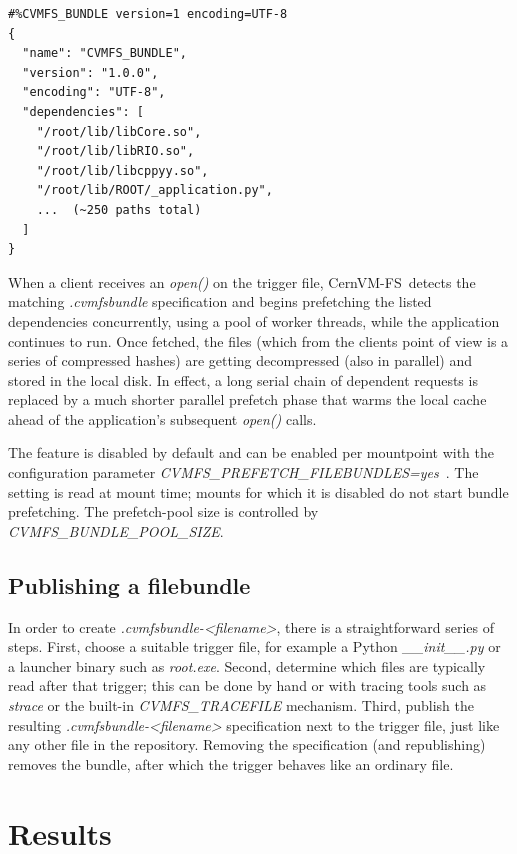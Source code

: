 \documentclass{webofc}
\newcommand{\cvmfs}{CernVM-FS}
\begin{document}
\begin{lstlisting}[style=bundle]
#%CVMFS_BUNDLE version=1 encoding=UTF-8
{
  "name": "CVMFS_BUNDLE",
  "version": "1.0.0",
  "encoding": "UTF-8",
  "dependencies": [
    "/root/lib/libCore.so",
    "/root/lib/libRIO.so",
    "/root/lib/libcppyy.so",
    "/root/lib/ROOT/_application.py",
    ...  (~250 paths total)
  ]
}
\end{lstlisting}

When a client receives an \emph{open()} on the trigger file, \cvmfs\ detects the matching
\emph{.cvmfsbundle} specification and begins prefetching the listed
dependencies concurrently, using a pool of worker threads, while the
application continues to run. 
Once fetched, the files (which from the clients point of view is a series of compressed hashes) are getting decompressed (also in parallel) and stored in the local disk.
In effect, a long serial chain of
dependent requests is replaced by a much shorter parallel prefetch
phase that warms the local cache ahead of the application's subsequent
\emph{open()} calls.

The feature is disabled by default and can be enabled per mountpoint with the configuration parameter
\emph{CVMFS\_PREFETCH\_FILEBUNDLES=yes}~\cite{ref-docs}. The setting
is read at mount time; mounts for which it is disabled do not start
bundle prefetching. The prefetch-pool size is controlled by
\emph{CVMFS\_BUNDLE\_POOL\_SIZE}.

\subsection{Publishing a filebundle}
\label{sec-publish}

In order to create \emph{.cvmfsbundle-<filename>}, there is a straightforward series of steps.
First, choose a suitable trigger file, for example a Python
\emph{\_\_init\_\_.py} or a launcher binary such as
\emph{root.exe}. Second, determine which files are typically read
after that trigger; this can be done by hand or with tracing tools such
as \emph{strace} or the built-in \emph{CVMFS\_TRACEFILE}
mechanism. Third, publish the resulting \emph{.cvmfsbundle-<filename>}
specification next to the trigger file, just like any other file in the
repository. Removing the specification (and republishing) removes the
bundle, after which the trigger behaves like an ordinary file.

\section{Results}
\label{sec-results}
\end{document}
